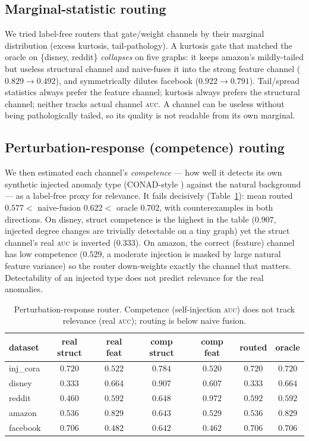 \documentclass[11pt]{article}
\newcommand{\auc}{\textsc{auc}}
\begin{document}
\subsection{Marginal-statistic routing}
We tried label-free routers that gate/weight channels by their marginal distribution
(excess kurtosis, tail-pathology). A kurtosis gate that matched the oracle on
\{disney, reddit\} \emph{collapses} on five graphs: it keeps amazon's mildly-tailed but useless
structural channel and naive-fuses it into the strong feature channel ($0.829\!\rightarrow\!
0.492$), and symmetrically dilutes facebook ($0.922\!\rightarrow\!0.791$). Tail/spread
statistics always prefer the feature channel; kurtosis always prefers the structural channel;
neither tracks actual channel \auc{}. A channel can be useless without being pathologically
tailed, so its quality is not readable from its own marginal.

\subsection{Perturbation-response (competence) routing}
We then estimated each channel's \emph{competence} --- how well it detects its own synthetic
injected anomaly type (CONAD-style \citep{xu2022conad}) against the natural background --- as a
label-free proxy for relevance. It fails decisively
(Table~\ref{tab:perturb}): mean routed $0.577 <$ naive-fusion $0.622 <$ oracle $0.702$, with
counterexamples in both directions. On disney, struct competence is the highest in the table
($0.907$, injected degree changes are trivially detectable on a tiny graph) yet the struct
channel's real \auc{} is inverted ($0.333$). On amazon, the correct (feature) channel has low
competence ($0.529$, a moderate injection is masked by large natural feature variance) so the
router down-weights exactly the channel that matters. Detectability of an injected type does
not predict relevance for the real anomalies.

\begin{table}[t]
\centering
\caption{Perturbation-response router. Competence (self-injection \auc{}) does not track
relevance (real \auc{}); routing is below naive fusion.}
\label{tab:perturb}
\begin{tabular}{lcccccc}
\toprule
dataset & real struct & real feat & comp struct & comp feat & routed & oracle \\
\midrule
inj\_cora & $0.720$ & $0.522$ & $0.784$ & $0.520$ & $0.720$ & $0.720$ \\
disney   & $0.333$ & $0.664$ & $0.907$ & $0.607$ & $0.333$ & $0.664$ \\
reddit   & $0.460$ & $0.592$ & $0.648$ & $0.972$ & $0.592$ & $0.592$ \\
amazon   & $0.536$ & $0.829$ & $0.643$ & $0.529$ & $0.536$ & $0.829$ \\
facebook & $0.706$ & $0.482$ & $0.642$ & $0.462$ & $0.706$ & $0.706$ \\
\bottomrule
\end{tabular}
\end{table}
\end{document}
